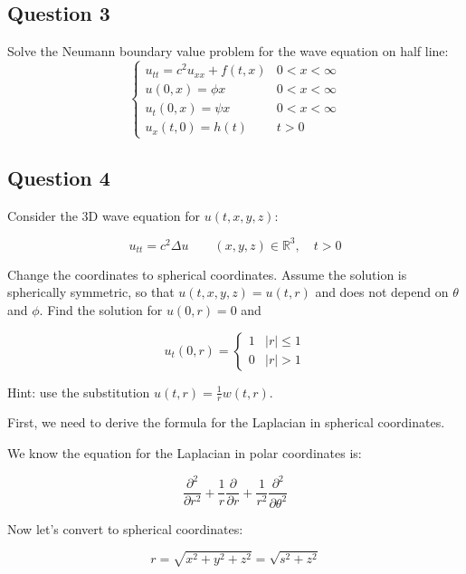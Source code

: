 \documentclass[
]{article}
\begin{document}
\hypertarget{question-3}{%
\subsection{Question 3}\label{question-3}}

Solve the Neumann boundary value problem for the wave equation on half
line: \begin{equation}
    \begin{cases}
      u_{tt}=c^2u_{xx}+f(t,x) & 0<x<\infty\\
      u(0,x)=\phi{x} & 0<x<\infty\\
      u_t(0,x) = \psi{x} & 0<x<\infty\\
      u_x(t,0) = h(t) & t>0
    \end{cases}       
\end{equation}

\hypertarget{question-4}{%
\subsection{Question 4}\label{question-4}}

Consider the 3D wave equation for \(u(t,x,y,z)\):

\[u_{tt}=c^2\Delta u \quad\quad (x,y,z) \in \mathbb{R}^3, \quad t>0\]

Change the coordinates to spherical coordinates. Assume the solution is
spherically symmetric, so that \(u(t,x,y,z)=u(t,r)\) and does not depend
on \(\theta\) and \(\phi\). Find the solution for \(u(0,r)=0\) and

\begin{equation} u_t(0,r) = \begin{cases}
  1  & \lvert{r}\rvert \leq 1 \\
  0 &  \lvert{r}\rvert > 1
\end{cases}
\end{equation}

Hint: use the substitution \(u(t,r)= \frac{1}{r} w(t,r)\).

First, we need to derive the formula for the Laplacian in spherical
coordinates.

We know the equation for the Laplacian in polar coordinates is:

\[\frac{\partial^2}{\partial r^2}+\frac{1}{r}\frac{\partial}{\partial r}+ \frac{1}{r^2}\frac{\partial^2}{\partial \theta^2}\]

Now let's convert to spherical coordinates:

\[r=\sqrt{x^2+y^2+z^2}=\sqrt{s^2+z^2}\]
\end{document}
